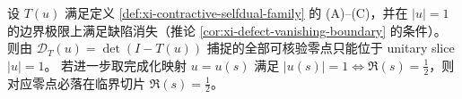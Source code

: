 \begin{theorem}\label{thm:xi-contract-defect-critical-slice-principle}
设 \(T(u)\) 满足定义 \ref{def:xi-contractive-selfdual-family} 的 (A)--(C)，并在 \(|u|=1\) 的边界极限上满足缺陷消失（推论 \ref{cor:xi-defect-vanishing-boundary} 的条件）。
则由 \(\mathcal{D}_T(u)=\det(I-T(u))\) 捕捉的全部可核验零点只能位于 unitary slice \(|u|=1\)。
若进一步取完成化映射 \(u=u(s)\) 满足 \(|u(s)|=1\iff \Re(s)=\tfrac12\)，则对应零点必落在临界切片 \(\Re(s)=\tfrac12\)。
\end{theorem}

\endinput
